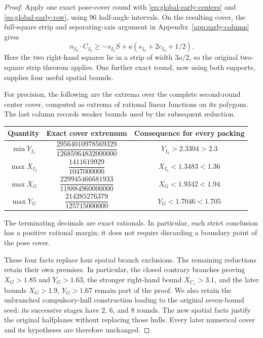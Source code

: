 \documentclass[11pt]{article}
\begin{document}
\begin{proof}
Apply one exact pose-cover round with \eqref{eq:global-early-centers}
and \eqref{eq:global-early-row}, using $96$ half-angle intervals.
On the resulting cover, the full-square strip and separating-axis
argument in Appendix~\ref{app:early-column} gives
\begin{equation}\label{eq:global-early-column}
 n_{I_2}\cdot C_{I_2}
 \ge -s_{I_2}S+a(s_{I_2}+2c_{I_2}+1/2).
\end{equation}
Here the two right-hand squares lie in a strip of width $3a/2$, so
the original two-square strip theorem applies. One further exact round,
now using both supports, supplies four useful spatial bounds.

For precision, the following are the extrema over the complete
second-round center cover, computed as extrema of rational linear
functions on its polygons. The last column records weaker bounds used
by the subsequent reduction.
\begin{center}
\renewcommand{\arraystretch}{1.65}
\begin{tabular}{c@{\qquad}c@{\qquad}c}
Quantity & Exact cover extremum & Consequence for every packing\\ \hline
$\min Y_{I_2}$ &
$\dfrac{29564010978569329}{12685964832000000}$ &
$Y_{I_2}>2.3304>2.3$\\
$\max X_{I_3}$ &
$\dfrac{1411619929}{1047000000}$ &
$X_{I_3}<1.3483<1.36$\\
$\max X_G$ &
$\dfrac{229945466681933}{118884960000000}$ &
$X_G<1.9342<1.94$\\
$\max Y_G$ &
$\dfrac{214285276379}{125715000000}$ &
$Y_G<1.7046<1.705$
\end{tabular}
\end{center}
The terminating decimals are exact rationals. In particular, each
strict conclusion has a positive rational margin; it does not require
discarding a boundary point of the pose cover.

These four facts replace four spatial branch exclusions. The remaining
reductions retain their own premises. In particular, the closed contrary
branches proving $X_G>1.85$ and $Y_G>1.63$, the stronger right-hand bound
$X_{C_1}>3.1$, and the later bounds $X_G>1.9$, $Y_G>1.67$ remain part of
the proof. We also retain the unbranched compulsory-hull construction
leading to the original seven-bound seed: its successive stages have
$2$, $6$, and $8$ rounds. The new spatial facts justify the original
halfplanes without replacing those hulls. Every later numerical cover
and its hypotheses are therefore unchanged.


\end{proof}
\end{document}
